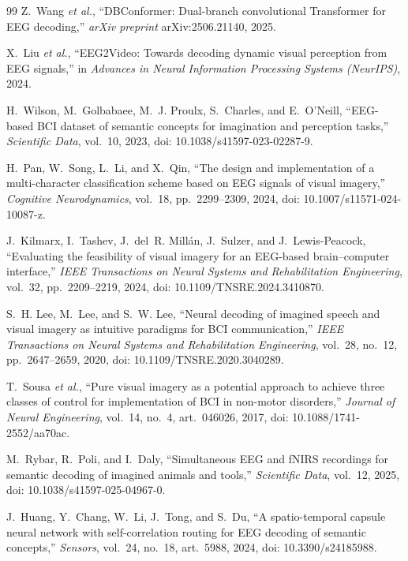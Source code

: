 \documentclass[conference]{IEEEtran}
\begin{document}
\begin{thebibliography}{99}
Z.~Wang \textit{et al.}, ``DBConformer: Dual-branch convolutional Transformer
for EEG decoding,'' \textit{arXiv preprint} arXiv:2506.21140, 2025.

X.~Liu \textit{et al.}, ``EEG2Video: Towards decoding dynamic visual
perception from EEG signals,'' in \textit{Advances in Neural Information
Processing Systems (NeurIPS)}, 2024.

H.~Wilson, M.~Golbabaee, M.~J. Proulx, S.~Charles, and E.~O'Neill,
``EEG-based BCI dataset of semantic concepts for imagination and perception
tasks,'' \textit{Scientific Data}, vol.~10, 2023,
doi: 10.1038/s41597-023-02287-9.

H.~Pan, W.~Song, L.~Li, and X.~Qin, ``The design and implementation of a
multi-character classification scheme based on EEG signals of visual
imagery,'' \textit{Cognitive Neurodynamics}, vol.~18, pp.~2299--2309, 2024,
doi: 10.1007/s11571-024-10087-z.

J.~Kilmarx, I.~Tashev, J.~del~R. Mill\'an, J.~Sulzer, and J.~Lewis-Peacock,
``Evaluating the feasibility of visual imagery for an EEG-based
brain--computer interface,'' \textit{IEEE Transactions on Neural Systems and
Rehabilitation Engineering}, vol.~32, pp.~2209--2219, 2024,
doi: 10.1109/TNSRE.2024.3410870.

S.~H. Lee, M.~Lee, and S.~W. Lee, ``Neural decoding of imagined speech and
visual imagery as intuitive paradigms for BCI communication,'' \textit{IEEE
Transactions on Neural Systems and Rehabilitation Engineering}, vol.~28,
no.~12, pp.~2647--2659, 2020, doi: 10.1109/TNSRE.2020.3040289.

T.~Sousa \textit{et al.}, ``Pure visual imagery as a potential approach to
achieve three classes of control for implementation of BCI in non-motor
disorders,'' \textit{Journal of Neural Engineering}, vol.~14, no.~4,
art.~046026, 2017, doi: 10.1088/1741-2552/aa70ac.

M.~Rybar, R.~Poli, and I.~Daly, ``Simultaneous EEG and fNIRS recordings for
semantic decoding of imagined animals and tools,'' \textit{Scientific Data},
vol.~12, 2025, doi: 10.1038/s41597-025-04967-0.

J.~Huang, Y.~Chang, W.~Li, J.~Tong, and S.~Du, ``A spatio-temporal capsule
neural network with self-correlation routing for EEG decoding of semantic
concepts,'' \textit{Sensors}, vol.~24, no.~18, art.~5988, 2024,
doi: 10.3390/s24185988.


\end{thebibliography}
\end{document}
